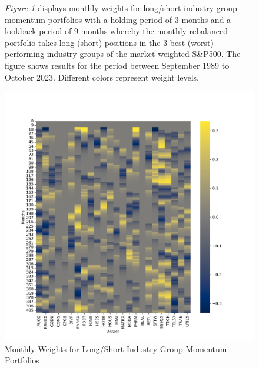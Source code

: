 \documentclass[a4paper,12pt,twoside]{article}
\begin{document}
\begin{figure}[H]
           \captionsetup{justification=centering}
   \caption{Monthly Weights for Long/Short Industry Group Momentum Portfolios}
    \label{fig_13}
    \textit{Figure \ref{fig_13}} displays monthly weights for long/short industry group momentum portfolios with a holding period of 3 months and a lookback period of 9 months whereby the monthly rebalanced portfolio takes long (short) positions in the 3 best (worst) performing industry groups of the market-weighted S\&P500. The figure shows results for the period between September 1989 to October 2023. Different colors represent weight levels.
    \centerline{\includegraphics[width=1\textwidth]{Plots/strategy_weights_long_short_IG.png}}
\end{figure} 
\end{document}
